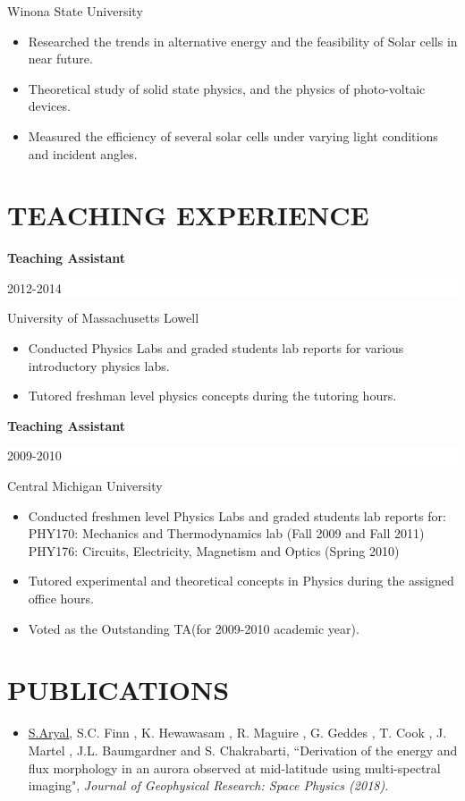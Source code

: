 \documentclass[paper=letter,fontsize=11pt]{scrartcl} %
\newcommand{\sepspace}{\vspace*{1em}}		%
\newcommand{\NewPart}[2]{\section*{\uppercase{#1} #2}}
\newcommand{\ArxivEntry}[3]{
		\noindent #1, ``{#2}", \textit{{}#3}.}
\begin{document}
{Winona State University}{\begin{itemize}
\item{Researched the trends in alternative energy and the feasibility of Solar cells in near future.}
\item{Theoretical study of solid state physics, and the physics of photo-voltaic devices.}
\item{Measured the efficiency of several solar cells under varying light conditions and incident angles.}
\end{itemize}
\NewPart{Teaching Experience}{}
\noindent \textbf{Teaching Assistant} \hfill      %
		\colorbox{White}{%
			\parbox{6em}{%
			\hfill\color{Black}2012-2014}} \par
{University of Massachusetts Lowell}{\begin{itemize}
\item{Conducted Physics Labs and graded students lab reports for various introductory physics labs. \\
}
\item{Tutored freshman level physics concepts during the tutoring hours.}
\end{itemize}}
\sepspace
\noindent \textbf{Teaching Assistant} \hfill      %
		\colorbox{White}{%
			\parbox{6em}{%
			\hfill\color{Black}2009-2010}} \par
{Central Michigan University}{\begin{itemize}
\item{Conducted freshmen level Physics Labs and graded students lab reports for:\\ PHY170: Mechanics and Thermodynamics lab (Fall 2009 and Fall 2011) \\
PHY176:  Circuits, Electricity, Magnetism and Optics (Spring 2010)}
\item{Tutored experimental and theoretical concepts in Physics during the assigned office hours.}
\item{Voted as the Outstanding TA(for 2009-2010 academic year).}
\end{itemize}}





\NewPart{Publications}{\href{http://scholar.google.com/citations?hl=en&user=1z6xR14AAAAJ}{}}

\begin{itemize}
\item \ArxivEntry{\underline{S.Aryal}, S.C. Finn , K. Hewawasam , R. Maguire ,
G. Geddes , T. Cook , J. Martel , J.L. Baumgardner
and S. Chakrabarti}{Derivation of the energy and flux morphology in an aurora observed at mid-latitude using multi-spectral imaging}{Journal of Geophysical Research: Space Physics (2018)}


\end{itemize}}
\end{document}
